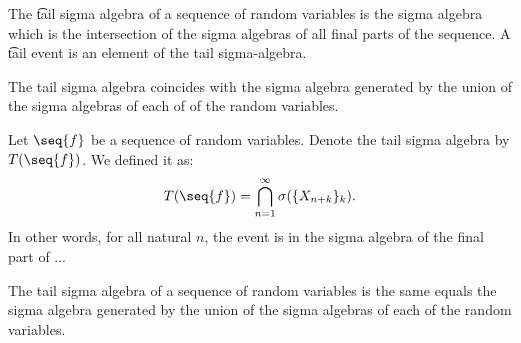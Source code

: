 


The \t{tail sigma algebra} of a sequence of random variables is the sigma algebra which is the intersection of the sigma algebras of all final parts of the sequence.
A \t{tail event} is an element of the tail sigma-algebra.

The tail sigma algebra coincides with the sigma algebra generated by the union of the sigma algebras of each of of the random variables.


Let $\seq{f}$ be a sequence of random variables.
Denote the tail sigma algebra by $T(\seq{f})$.
We defined it as:
  \[
T(\seq{f}) = \bintersection_{n = 1}^{\infty} \sigma(\set{X_{n+k}}_k).
  \]
In other words, for all natural $n$, the event is in the sigma algebra of the final part of ...


\begin{proposition}
The tail sigma algebra of a sequence of random variables is the same equals the sigma algebra generated by the union of the sigma algebras of each of the random variables.
\end{proposition}

\blankpage
